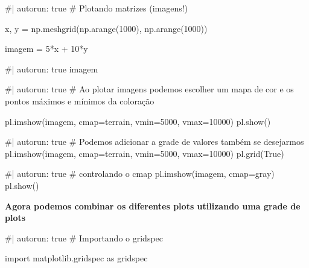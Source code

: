 \documentclass[
  letterpaper,
  DIV=11,
  numbers=noendperiod]{scrreprt}
\newenvironment{Shaded}{\begin{snugshade}}{\end{snugshade}}
\newcommand{\NormalTok}[1]{\textcolor[rgb]{0.00,0.23,0.31}{#1}}
\begin{document}
\begin{Shaded}
\begin{Highlighting}[]
\NormalTok{\#| autorun: true}
\NormalTok{\# Plotando matrizes (imagens!)}

\NormalTok{x, y = np.meshgrid(np.arange(1000), np.arange(1000))}

\NormalTok{imagem = 5*x + 10*y}
\end{Highlighting}
\end{Shaded}

\begin{Shaded}
\begin{Highlighting}[]
\NormalTok{\#| autorun: true}
\NormalTok{imagem}
\end{Highlighting}
\end{Shaded}

\begin{Shaded}
\begin{Highlighting}[]
\NormalTok{\#| autorun: true}
\NormalTok{\# Ao plotar imagens podemos escolher um mapa de cor e os pontos máximos e mínimos da coloração}

\NormalTok{pl.imshow(imagem, cmap=\textquotesingle{}terrain\textquotesingle{}, vmin=5000, vmax=10000)}
\NormalTok{pl.show()}
\end{Highlighting}
\end{Shaded}

\begin{Shaded}
\begin{Highlighting}[]
\NormalTok{\#| autorun: true}
\NormalTok{\# Podemos adicionar a grade de valores também se desejarmos}
\NormalTok{pl.imshow(imagem, cmap=\textquotesingle{}terrain\textquotesingle{}, vmin=5000, vmax=10000)}
\NormalTok{pl.grid(True)}
\end{Highlighting}
\end{Shaded}

\begin{Shaded}
\begin{Highlighting}[]
\NormalTok{\#| autorun: true}
\NormalTok{\# controlando o cmap}
\NormalTok{pl.imshow(imagem, cmap=\textquotesingle{}gray\textquotesingle{})}
\NormalTok{pl.show()}
\end{Highlighting}
\end{Shaded}

\textbf{Agora podemos combinar os diferentes plots utilizando uma grade
de plots}

\begin{Shaded}
\begin{Highlighting}[]
\NormalTok{\#| autorun: true}
\NormalTok{\# Importando o gridspec}

\NormalTok{import matplotlib.gridspec as gridspec}
\end{Highlighting}
\end{Shaded}
\end{document}
